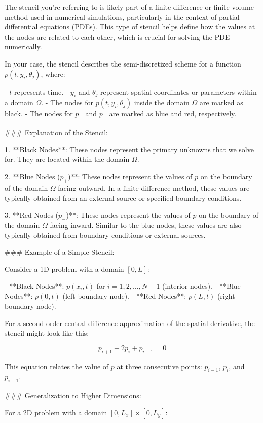 The stencil you're referring to is likely part of a finite difference or finite volume method used in numerical simulations, particularly in the context of partial differential equations (PDEs). This type of stencil helps define how the values at the nodes are related to each other, which is crucial for solving the PDE numerically.

In your case, the stencil describes the semi-discretized scheme for a function \( p(t, y_i, \theta_j) \), where:

- \( t \) represents time.
- \( y_i \) and \( \theta_j \) represent spatial coordinates or parameters within a domain \( \Omega \).
- The nodes for \( p(t, y_i, \theta_j) \) inside the domain \( \Omega \) are marked as black.
- The nodes for \( p_+ \) and \( p_- \) are marked as blue and red, respectively.

### Explanation of the Stencil:

1. **Black Nodes**: These nodes represent the primary unknowns that we solve for. They are located within the domain \( \Omega \).

2. **Blue Nodes (\( p_+ \))**: These nodes represent the values of \( p \) on the boundary of the domain \( \Omega \) facing outward. In a finite difference method, these values are typically obtained from an external source or specified boundary conditions.

3. **Red Nodes (\( p_- \))**: These nodes represent the values of \( p \) on the boundary of the domain \( \Omega \) facing inward. Similar to the blue nodes, these values are also typically obtained from boundary conditions or external sources.

### Example of a Simple Stencil:

Consider a 1D problem with a domain \( [0, L] \):

- **Black Nodes**: \( p(x_i, t) \) for \( i = 1, 2, \ldots, N-1 \) (interior nodes).
- **Blue Nodes**: \( p(0, t) \) (left boundary node).
- **Red Nodes**: \( p(L, t) \) (right boundary node).

For a second-order central difference approximation of the spatial derivative, the stencil might look like this:

\[ p_{i+1} - 2p_i + p_{i-1} = 0 \]

This equation relates the value of \( p \) at three consecutive points: \( p_{i-1} \), \( p_i \), and \( p_{i+1} \).

### Generalization to Higher Dimensions:

For a 2D problem with a domain \( [0, L_x] \times [0, L_y] \):


